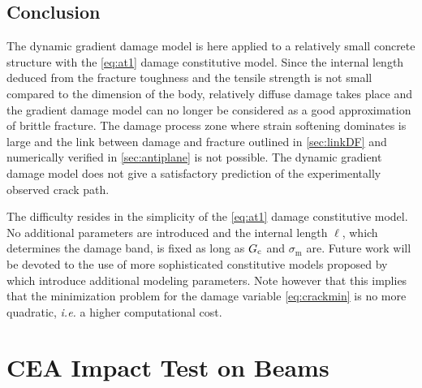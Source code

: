 \subsection*{Conclusion}
The dynamic gradient damage model is here applied to a relatively small concrete structure with the \eqref{eq:at1} damage constitutive model. Since the internal length deduced from the fracture toughness and the tensile strength is not small compared to the dimension of the body, relatively diffuse damage takes place and the gradient damage model can no longer be considered as a good approximation of brittle fracture. The damage process zone where strain softening dominates is large and the link between damage and fracture outlined in \cref{sec:linkDF} and numerically verified in \cref{sec:antiplane} is not possible. The dynamic gradient damage model does not give a satisfactory prediction of the experimentally observed crack path.

The difficulty resides in the simplicity of the \eqref{eq:at1} damage constitutive model. No additional parameters are introduced and the internal length $\ell$, which determines the damage band, is fixed as long as $G_\mathrm{c}$ and $\sigma_\mathrm{m}$ are. Future work will be devoted to the use of more sophisticated constitutive models proposed by \cite{LorentzCuvilliezKazymyrenko:2011,AlessiMarigoVidoli:2015} which introduce additional modeling parameters. Note however that this implies that the minimization problem for the damage variable \eqref{eq:crackmin} is no more quadratic, \emph{i.e.} a higher computational cost.

\section{CEA Impact Test on Beams} \label{sec:beam}